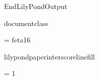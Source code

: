 %
%
%
\edef\lilyponddefsELC{\the\endlinechar}%
\relax

\def\ifundefined#1{
  \expandafter\ifx\csname#1\endcsname\relax
}


\ifx\mustmakelilypondtitle\undefined
\else
  \makelilypondtitle
\fi

\ifx\mustmakelilypondpiecetitle\undefined
\else
  \makelilypondpiecetitle
\fi


\def\SkipLilydefs{
  \endlinechar \lilyponddefsELC
  \endinput}
\ifundefined{EndLilyPondOutput}
  \def\EndLilyPondOutput{\csname bye\endcsname}
  \def\SkipLilydefs{}
\fi
\SkipLilydefs


\ifundefined{documentclass}
  

  \ifdim0pt<\lilypondpaperlinewidth\lilypondpaperunit
  \hsize=\lilypondpaperlinewidth\lilypondpaperunit
  \fi
\else
  
\fi



\font\fetasixteen = feta16
\def\fetafont{\fetasixteen}
\def\fetachar#1{\hbox{\fetasixteen#1}}

\def\botalign#1{
  \vbox to 0pt{\vss #1}
}
\def\leftalign#1{
  \hbox to 0pt{#1\hss}
}


%
%

\def\myfilbreak{}%


\ifundefined{lilypondpaperinterscorelinefill}
  \def\lilypondpaperinterscorelinefill{0}
\else
  \def\lilypondpaperinterscorelinefill{1}
\fi

\def\interscoreline{
  \vskip \lilypondpaperinterscoreline \lilypondpaperunit
    plus \lilypondpaperinterscorelinefill fill
}

\def\placebox#1#2#3{
  \botalign{
    \hbox{\raise #1\leftalign{\kern #2{}#3}}
  }
}

\ifx\pdfoutput\undefined  
  
\else
  \ifx\pdfoutput\relax
    
  \else
    \pdfoutput = 1
    
  \fi
\fi

